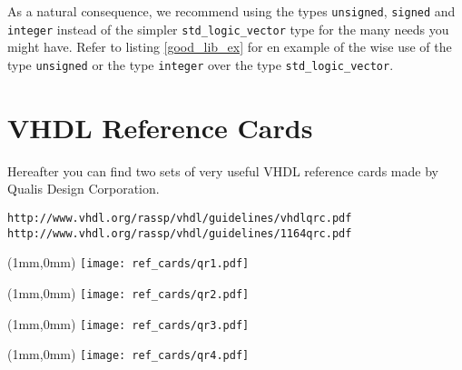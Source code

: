 As a natural consequence, we recommend using the types \texttt{unsigned}, \texttt{signed} and \texttt{integer} instead of the simpler \texttt{std\_logic\_vector} type for the many needs you might have. Refer to listing \ref{good_lib_ex} for en example of the wise use of the type \texttt{unsigned} or the type \texttt{integer} over the type \texttt{std\_logic\_vector}.

\chapter{VHDL Reference Cards}
Hereafter you can find two sets of very useful VHDL reference cards made by Qualis Design Corporation.

\begin{verbatim}
http://www.vhdl.org/rassp/vhdl/guidelines/vhdlqrc.pdf
http://www.vhdl.org/rassp/vhdl/guidelines/1164qrc.pdf
\end{verbatim}

\newpage\clearpage
\thispagestyle{empty}
\begin{textblock*}{148mm}(1mm,0mm)
\texttt{[image: ref\_cards/qr1.pdf]}
\end{textblock*}
\null\newpage

\thispagestyle{empty}
\begin{textblock*}{148mm}(1mm,0mm)
\texttt{[image: ref\_cards/qr2.pdf]}
\end{textblock*}
\null\newpage

\thispagestyle{empty}
\begin{textblock*}{148mm}(1mm,0mm)
\texttt{[image: ref\_cards/qr3.pdf]}
\end{textblock*}
\null\newpage

\thispagestyle{empty}
\begin{textblock*}{148mm}(1mm,0mm)
\texttt{[image: ref\_cards/qr4.pdf]}
\end{textblock*}
\null\newpage

